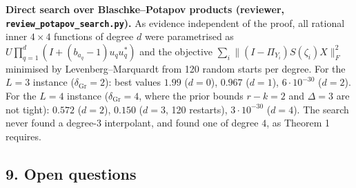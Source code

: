 \documentclass[
  11pt,
  a4paper,
]{article}
\begin{document}
\textbf{Direct search over Blaschke--Potapov products (reviewer,
{\small\texttt{review\_\allowbreak{}potapov\_\allowbreak{}search.\allowbreak{}py}}).} As evidence independent of the
proof, all rational inner \(4\times4\) functions of degree \(d\) were
parametrised as \(U\prod_{q=1}^d(I+(b_{a_q}-1)u_qu_q^*)\) and the
objective \(\sum_i\|(I-\Pi_{Y_i})S(\zeta_i)X\|_F^2\) minimised by
Levenberg--Marquardt from 120 random starts per degree. For the \(L=3\)
instance (\(\delta_{\mathrm{Gr}}=2\)): best values \(1.99\) (\(d=0\)),
\(0.967\) (\(d=1\)), \(6\cdot10^{-30}\) (\(d=2\)). For the \(L=4\)
instance (\(\delta_{\mathrm{Gr}}=4\), where the prior bounds \(r-k=2\)
and \(\Delta=3\) are not tight): \(0.572\) (\(d=2\)), \(0.150\)
(\(d=3\), 120 restarts), \(3\cdot10^{-30}\) (\(d=4\)). The search never
found a degree-\(3\) interpolant, and found one of degree \(4\), as
Theorem 1 requires.

\subsection{9. Open questions}\label{open-questions}
\end{document}
